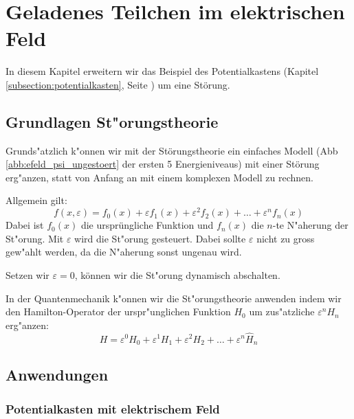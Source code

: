 \chapter{Geladenes Teilchen im elektrischen Feld\label{chapter:efeld}}
\begin{refsection}


In diesem Kapitel erweitern wir das Beispiel des Potentialkastens 
(Kapitel \ref{subsection:potentialkasten}, Seite \pageref{subsection:potentialkasten})
um eine St\"orung.

\section{Grundlagen St"orungstheorie}
Grunds"atzlich k"onnen wir mit der St\"orungstheorie ein einfaches Modell 
(Abb \ref{abb:efeld_psi_ungestoert} der ersten 5 Energieniveaus) 
mit einer St\"orung erg"anzen, statt von Anfang an mit einem komplexen Modell zu rechnen.

Allgemein gilt:
\[
  f(x, \varepsilon) = f_0(x) + \varepsilon f_1(x) + \varepsilon^2 f_2(x) + \ldots + \varepsilon^n f_n(x)
\]
Dabei ist $f_0(x)$ die urspr\"ungliche Funktion und $f_n(x)$ die $n$-te  N"aherung der St"orung.
Mit $\varepsilon$ wird die St"orung gesteuert. Dabei sollte $\varepsilon$ nicht zu gross gew"ahlt werden, 
da die N"aherung sonst ungenau wird. 

Setzen wir $\varepsilon = 0$, k\"onnen wir die St"orung dynamisch abschalten.

In der Quantenmechanik k"onnen wir die St"orungstheorie anwenden indem wir den Hamilton-Operator der 
urspr"unglichen Funktion $H_0$ um zus"atzliche $\varepsilon^n H_n$ erg"anzen:
\[
  H = \varepsilon^0 H_0 + \varepsilon^1 H_1 + \varepsilon^2 H_2 + \ldots + \varepsilon^n \hat H_n
\]












\section{Anwendungen}

\subsection{Potentialkasten mit elektrischem Feld}


\end{refsection}
